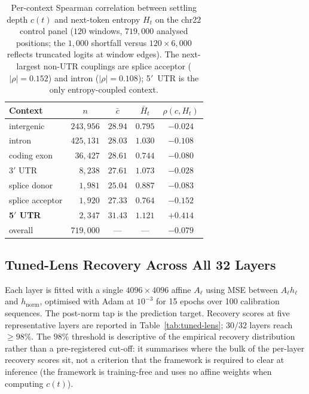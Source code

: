 \documentclass{article}
\theoremstyle{plain}
\theoremstyle{definition}
\theoremstyle{remark}
\newcommand{\hnorm}{h_{\mathrm{norm}}}
\begin{document}
\begin{table}[!htbp]
  \caption{Per-context Spearman correlation between settling depth $c(t)$
    and next-token entropy $H_t$ on the chr22 control panel
    ($120$ windows, $719{,}000$ analysed positions; the $1{,}000$ shortfall versus
    $120\!\times\!6{,}000$ reflects truncated logits at window edges). The next-largest
    non-UTR couplings are splice acceptor ($|\rho|\!=\!0.152$) and intron
  ($|\rho|\!=\!0.108$); 5$'$~UTR is the only entropy-coupled context.}
  \label{tab:entropy-decoup}
  \centering
  \small
  \begin{tabular}{@{}lcccc@{}}
    \toprule
    Context & $n$ & $\bar c$ & $\bar H_t$ & $\rho(c, H_t)$ \\
    \midrule
    intergenic        & $243{,}956$ & $28.94$ & $0.795$ & $-0.024$ \\
    intron            & $425{,}131$ & $28.03$ & $1.030$ & $-0.108$ \\
    coding exon       & $\phantom{0}36{,}427$ & $28.61$ & $0.744$ & $-0.080$ \\
    3$'$ UTR          & $\phantom{00}8{,}238$ & $27.61$ & $1.073$ & $-0.028$ \\
    splice donor      & $\phantom{00}1{,}981$ & $25.04$ & $0.887$ & $-0.083$ \\
    splice acceptor   & $\phantom{00}1{,}920$ & $27.33$ & $0.764$ & $-0.152$ \\
    \textbf{5$'$ UTR} & $\phantom{00}2{,}347$ & $31.43$ & $1.121$ & $\mathbf{+0.414}$ \\
    \midrule
    overall           & $719{,}000$ & --- & --- & $-0.079$ \\
    \bottomrule
  \end{tabular}
\end{table}

\subsection{Tuned-Lens Recovery Across All 32 Layers}
\label{app:tuned-lens}

Each layer is fitted with a single $4096 \times 4096$ affine $A_{\ell}$
using MSE between $A_{\ell} h_{\ell}$ and $\hnorm$, optimised with Adam
at $10^{-3}$ for 15 epochs over 100 calibration sequences. The
post-norm tap is the prediction target. Recovery scores at five
representative layers are reported in Table~\ref{tab:tuned-lens};
$30/32$ layers reach $\ge 98\%$. The $98\%$ threshold is descriptive of
the empirical recovery distribution rather than a pre-registered
cut-off: it summarises where the bulk of the per-layer recovery scores
sit, not a criterion that the framework is required to clear at
inference (the framework is training-free and uses no affine weights
when computing $c(t)$).
\end{document}
